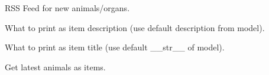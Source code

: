 \documentclass[letterpaper,10pt,openany,oneside,english]{sphinxmanual}
\begin{document}
\begin{fulllineitems}
\label{\detokenize{index:animals.views.LatestAnimalsFeed}}
RSS Feed for new animals/organs.

\begin{fulllineitems}
\label{\detokenize{index:animals.views.LatestAnimalsFeed.item_description}}
What to print as item description (use default description from model).

\end{fulllineitems}


\begin{fulllineitems}
\label{\detokenize{index:animals.views.LatestAnimalsFeed.item_title}}
What to print as item title (use default \_\_str\_\_ of model).

\end{fulllineitems}


\begin{fulllineitems}
\label{\detokenize{index:animals.views.LatestAnimalsFeed.items}}
Get latest animals as items.

\end{fulllineitems}


\end{fulllineitems}

\end{document}
